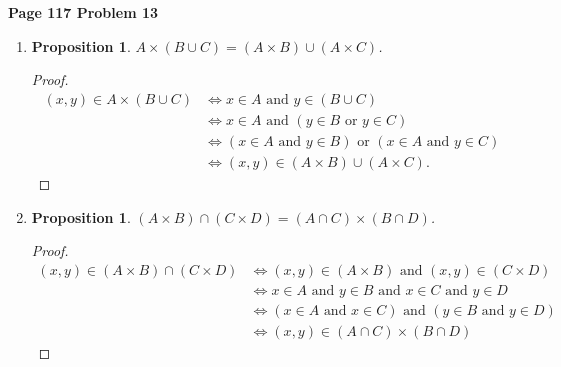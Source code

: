 \documentclass{article}
\newtheorem{prop}[thm]{Proposition}
\begin{document}
\textbf{Page 117 Problem 13}
\begin{enumerate}[label={(\roman*)}]
    \item 
    \begin{prop}
        $A \times (B \cup C) = (A \times B) \cup (A \times C)$.
    \end{prop}
    \begin{proof}
        \begin{align}
            (x,y) \in A \times (B \cup C) & \Leftrightarrow x \in A \text{ and } y \in (B \cup C) \\
            & \Leftrightarrow x \in A \text{ and } (y \in B \text{ or } y \in C) \\
            & \Leftrightarrow (x \in A \text{ and } y \in B) \text{ or } (x \in A \text{ and } y \in C) \\
            & \Leftrightarrow (x,y) \in (A \times B) \cup (A \times C).
        \end{align}
    \end{proof}

    \item 
    \begin{prop}
        $(A \times B) \cap (C \times D) = (A \cap C) \times (B \cap D)$.
    \end{prop}
    \begin{proof}
        \begin{align}
            (x,y) \in (A\times B) \cap (C\times D) & \Leftrightarrow (x,y) \in (A\times B) \text{ and } (x,y) \in (C\times D) \\
            & \Leftrightarrow x \in A \text{ and } y \in B \text{ and } x\in C \text{ and } y\in D \\
            & \Leftrightarrow (x \in A \text{ and } x\in C) \text{ and } (y \in B \text{ and } y\in D) \\
            & \Leftrightarrow (x,y) \in (A \cap C) \times (B \cap D)
        \end{align}
    \end{proof}
\end{enumerate}
\bigbreak
\end{document}
